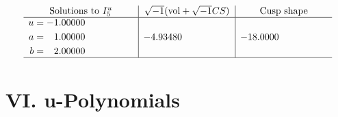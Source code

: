 \documentclass[1p]{elsarticle_modified}
\theoremstyle{definition}
\newcommand{\I}{\sqrt{-1}}
\begin{document}
$$\begin{array}{c|c|c}  
\text{Solutions to }I^u_{5}& \I (\text{vol} + \sqrt{-1}CS) & \text{Cusp shape}\\
 \hline 
\begin{aligned}
u &= -1.00000\phantom{ +0.000000I} \\
a &= \phantom{-}1.00000\phantom{ +0.000000I} \\
b &= \phantom{-}2.00000\phantom{ +0.000000I}\end{aligned}
 & -4.93480\phantom{ +0.000000I} & -18.0000\phantom{ +0.000000I}\\
 \hline 
 \end{array}$$\newpage
\newpage\renewcommand{\arraystretch}{1}
\centering \section*{ VI. u-Polynomials}
\end{document}
